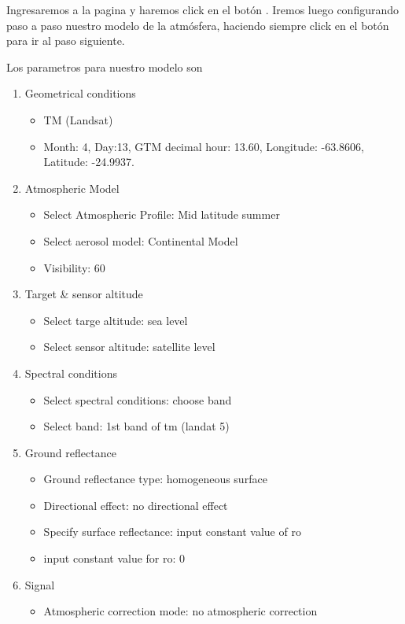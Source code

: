 Ingresaremos a la pagina y haremos click en el bot\'on
. Iremos luego configurando paso a paso nuestro modelo de la
atm\'osfera, haciendo siempre click en el bot\'on  para
ir al paso siguiente.

Los parametros para nuestro modelo son

\begin{enumerate}
    \item Geometrical conditions
        \begin{itemize}
            \item TM (Landsat)
            \item Month: 4, Day:13, GTM decimal hour: 13.60, Longitude:
                -63.8606, Latitude: -24.9937.
        \end{itemize}
    \item Atmospheric Model
        \begin{itemize}
            \item Select Atmospheric Profile: Mid latitude summer
            \item Select aerosol model: Continental Model
            \item Visibility: 60
        \end{itemize}
    \item Target \& sensor altitude
        \begin{itemize}
            \item Select targe altitude: sea level
            \item Select sensor altitude: satellite level
        \end{itemize}
    \item Spectral conditions
        \begin{itemize}
            \item Select spectral conditions: choose band
            \item Select band: 1st band of tm (landat 5)
        \end{itemize}
    \item Ground reflectance
        \begin{itemize}
            \item Ground reflectance type: homogeneous surface
            \item Directional effect: no directional effect
            \item Specify surface reflectance: input constant value of ro
            \item input constant value for ro: 0
        \end{itemize}
    \item Signal
        \begin{itemize}
            \item Atmospheric correction mode: no atmospheric correction
        \end{itemize}
\end{enumerate}

